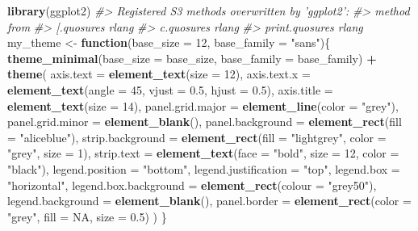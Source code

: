 \documentclass[]{book}
\newenvironment{Shaded}{\begin{snugshade}}{\end{snugshade}}
\newcommand{\CommentTok}[1]{\textcolor[rgb]{0.56,0.35,0.01}{\textit{#1}}}
\newcommand{\ControlFlowTok}[1]{\textcolor[rgb]{0.13,0.29,0.53}{\textbf{#1}}}
\newcommand{\DataTypeTok}[1]{\textcolor[rgb]{0.13,0.29,0.53}{#1}}
\newcommand{\DecValTok}[1]{\textcolor[rgb]{0.00,0.00,0.81}{#1}}
\newcommand{\FloatTok}[1]{\textcolor[rgb]{0.00,0.00,0.81}{#1}}
\newcommand{\KeywordTok}[1]{\textcolor[rgb]{0.13,0.29,0.53}{\textbf{#1}}}
\newcommand{\NormalTok}[1]{#1}
\newcommand{\OperatorTok}[1]{\textcolor[rgb]{0.81,0.36,0.00}{\textbf{#1}}}
\newcommand{\OtherTok}[1]{\textcolor[rgb]{0.56,0.35,0.01}{#1}}
\newcommand{\StringTok}[1]{\textcolor[rgb]{0.31,0.60,0.02}{#1}}
\begin{document}
\begin{Shaded}
\begin{Highlighting}[]
\KeywordTok{library}\NormalTok{(ggplot2)}
\CommentTok{#> Registered S3 methods overwritten by 'ggplot2':}
\CommentTok{#>   method         from }
\CommentTok{#>   [.quosures     rlang}
\CommentTok{#>   c.quosures     rlang}
\CommentTok{#>   print.quosures rlang}
\NormalTok{my_theme <-}\StringTok{ }\ControlFlowTok{function}\NormalTok{(}\DataTypeTok{base_size =} \DecValTok{12}\NormalTok{, }\DataTypeTok{base_family =} \StringTok{"sans"}\NormalTok{)\{}
  \KeywordTok{theme_minimal}\NormalTok{(}\DataTypeTok{base_size =}\NormalTok{ base_size, }\DataTypeTok{base_family =}\NormalTok{ base_family) }\OperatorTok{+}
\StringTok{  }\KeywordTok{theme}\NormalTok{(}
    \DataTypeTok{axis.text =} \KeywordTok{element_text}\NormalTok{(}\DataTypeTok{size =} \DecValTok{12}\NormalTok{),}
    \DataTypeTok{axis.text.x =} \KeywordTok{element_text}\NormalTok{(}\DataTypeTok{angle =} \DecValTok{45}\NormalTok{, }\DataTypeTok{vjust =} \FloatTok{0.5}\NormalTok{, }\DataTypeTok{hjust =} \FloatTok{0.5}\NormalTok{),}
    \DataTypeTok{axis.title =} \KeywordTok{element_text}\NormalTok{(}\DataTypeTok{size =} \DecValTok{14}\NormalTok{),}
    \DataTypeTok{panel.grid.major =} \KeywordTok{element_line}\NormalTok{(}\DataTypeTok{color =} \StringTok{"grey"}\NormalTok{),}
    \DataTypeTok{panel.grid.minor =} \KeywordTok{element_blank}\NormalTok{(),}
    \DataTypeTok{panel.background =} \KeywordTok{element_rect}\NormalTok{(}\DataTypeTok{fill =} \StringTok{"aliceblue"}\NormalTok{),}
    \DataTypeTok{strip.background =} \KeywordTok{element_rect}\NormalTok{(}\DataTypeTok{fill =} \StringTok{"lightgrey"}\NormalTok{, }\DataTypeTok{color =} \StringTok{"grey"}\NormalTok{, }
                                    \DataTypeTok{size =} \DecValTok{1}\NormalTok{),}
    \DataTypeTok{strip.text =} \KeywordTok{element_text}\NormalTok{(}\DataTypeTok{face =} \StringTok{"bold"}\NormalTok{, }\DataTypeTok{size =} \DecValTok{12}\NormalTok{, }\DataTypeTok{color =} \StringTok{"black"}\NormalTok{),}
    \DataTypeTok{legend.position =} \StringTok{"bottom"}\NormalTok{,}
    \DataTypeTok{legend.justification =} \StringTok{"top"}\NormalTok{, }
    \DataTypeTok{legend.box =} \StringTok{"horizontal"}\NormalTok{,}
    \DataTypeTok{legend.box.background =} \KeywordTok{element_rect}\NormalTok{(}\DataTypeTok{colour =} \StringTok{"grey50"}\NormalTok{),}
    \DataTypeTok{legend.background =} \KeywordTok{element_blank}\NormalTok{(),}
    \DataTypeTok{panel.border =} \KeywordTok{element_rect}\NormalTok{(}\DataTypeTok{color =} \StringTok{"grey"}\NormalTok{, }\DataTypeTok{fill =} \OtherTok{NA}\NormalTok{, }\DataTypeTok{size =} \FloatTok{0.5}\NormalTok{)}
\NormalTok{  )}
\NormalTok{\}}
\end{Highlighting}
\end{Shaded}
\end{document}
